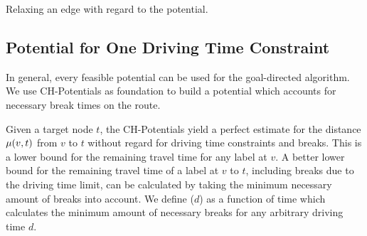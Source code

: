 \begin{algorithm}[hbtp]
	\DontPrintSemicolon



	\caption{\label{alg:relax_edge_a_star} Relaxing an edge with regard to the potential.}
\end{algorithm}

\subsection{Potential for One Driving Time Constraint}\label{section:potential_csp}
In general, every feasible potential can be used for the goal-directed algorithm. We use CH-Potentials as foundation to build a potential which accounts for necessary break times on the route.

Given a target node $t$, the CH-Potentials yield a perfect estimate for the distance $\mu(v,t)$ from $v$ to $t$ without regard for driving time constraints and breaks. This is a lower bound for the remaining travel time for any label at $v$. A better lower bound for the remaining travel time of a label at $v$ to $t$, including breaks due to the driving time limit, can be calculated by taking the minimum necessary amount of breaks into account. We define \minBreaks($d$) as a function of time which calculates the minimum amount of necessary breaks for any arbitrary driving time $d$.

